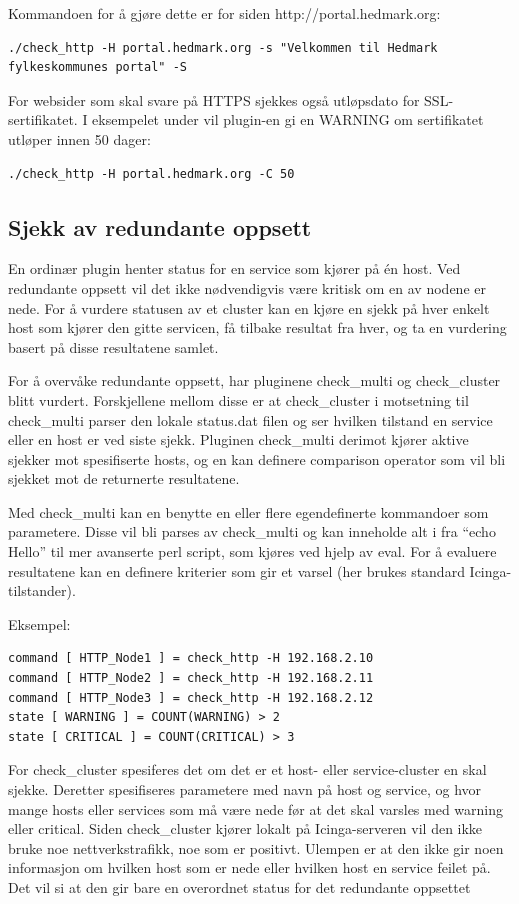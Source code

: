 Kommandoen for å gjøre dette er for siden http://portal.hedmark.org:
\begin{lstlisting}
./check_http -H portal.hedmark.org -s "Velkommen til Hedmark fylkeskommunes portal" -S 
\end{lstlisting}

For websider som skal svare på HTTPS sjekkes også utløpsdato for SSL-sertifikatet. I eksempelet under vil plugin-en gi en WARNING om sertifikatet utløper innen 50 dager:
\begin{lstlisting}
./check_http -H portal.hedmark.org -C 50
\end{lstlisting}

\subsection{Sjekk av redundante oppsett}
En ordinær plugin henter status for en service som kjører på én host. Ved redundante oppsett vil det ikke nødvendigvis være kritisk om en av nodene er nede. For å vurdere statusen av et cluster kan en kjøre en sjekk på hver enkelt host som kjører den gitte servicen, få tilbake resultat fra hver, og ta en vurdering basert på disse resultatene samlet.

For å overvåke redundante oppsett, har pluginene check\_multi og check\_cluster blitt vurdert.  Forskjellene mellom disse er at check\_cluster i motsetning til check\_multi parser den lokale status.dat filen og ser hvilken tilstand en service eller en host er ved siste sjekk. Pluginen check\_multi derimot kjører aktive sjekker mot spesifiserte hosts, og en kan definere comparison operator som vil bli sjekket mot de returnerte resultatene.

Med check\_multi kan en benytte en eller flere egendefinerte kommandoer som parametere. Disse vil bli parses av check\_multi og kan inneholde alt i fra “echo Hello” til mer avanserte perl script, som kjøres ved hjelp av eval. For å evaluere resultatene kan en definere kriterier som gir et varsel (her brukes standard Icinga-tilstander). 

Eksempel:
\begin{lstlisting}
command [ HTTP_Node1 ] = check_http -H 192.168.2.10
command [ HTTP_Node2 ] = check_http -H 192.168.2.11
command [ HTTP_Node3 ] = check_http -H 192.168.2.12
state [ WARNING ] = COUNT(WARNING) > 2
state [ CRITICAL ] = COUNT(CRITICAL) > 3
\end{lstlisting}
For check\_cluster spesiferes det om det er et host- eller service-cluster en skal sjekke. Deretter spesifiseres parametere med navn på host og service, og hvor mange hosts eller services som må være nede før at det skal varsles med warning eller critical. Siden check\_cluster kjører lokalt på Icinga-serveren vil den ikke bruke noe nettverkstrafikk, noe som er positivt. Ulempen er at den ikke gir noen informasjon om hvilken host som er nede eller hvilken host en service feilet på. Det vil si at den gir bare en overordnet status for det redundante oppsettet     

